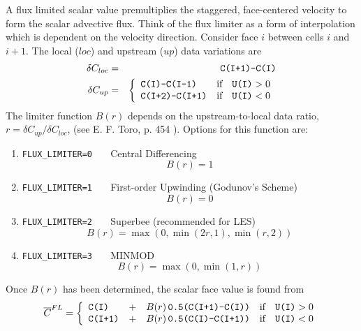 \documentclass[11pt]{article}
\begin{document}
A flux limited scalar value premultiplies the staggered, face-centered velocity to form the scalar advective flux.  Think of the flux limiter as a form of interpolation which is dependent on the velocity direction. Consider face $i$ between cells $i$ and $i+1$.  The local ($loc$) and upstream ($up$) data variations are
\begin{eqnarray}
\delta C_{loc} &=& \mbox{\tt C(I+1)-C(I)} \nonumber\\
\delta C_{up}  &=& \left\{ \begin{array}{ll} \mbox{\tt C(I)-C(I-1)} & \mbox{if} \quad \mbox{\tt U(I)}>0 \\ \mbox{\tt C(I+2)-C(I+1)} & \mbox{if} \quad \mbox{\tt U(I)}<0 \end{array} \right. \nonumber
\end{eqnarray}
The limiter function $B(r)$ depends on the upstream-to-local data ratio, $r=\delta C_{up}/\delta C_{loc}$, (see E. F. Toro, p. 454 \cite{Toro}).  Options for this function are:
\begin{enumerate}
\item[]{\tt FLUX\_LIMITER=0\,\,\,} Central Differencing  \begin{equation} B(r) = 1 \end{equation}
\item[]{\tt FLUX\_LIMITER=1\,\,\,} First-order Upwinding (Godunov's Scheme) \begin{equation} B(r) = 0 \end{equation}
\item[]{\tt FLUX\_LIMITER=2\,\,\,} Superbee (recommended for LES) \begin{equation} B(r) = \max(0,\min(2r,1),\min(r,2)) \end{equation}
\item[]{\tt FLUX\_LIMITER=3\,\,\,} MINMOD \begin{equation} B(r) = \max(0,\min(1,r)) \end{equation}
\end{enumerate}
Once $B(r)$ has been determined, the scalar face value is found from
\begin{equation}
\label{eqn_flux_limiter}
\overline{C}^{\tiny FL} = \left\{ \begin{array}{lcll} \mbox{\tt C(I)} &+& B(r) \,\mbox{\tt 0.5(C(I+1)-C(I))} & \mbox{if} \quad \mbox{\tt U(I)}>0 \\
\mbox{\tt C(I+1)} &+& B(r) \,\mbox{\tt 0.5(C(I)-C(I+1))} & \mbox{if} \quad \mbox{\tt U(I)}<0 \end{array} \right.
\end{equation}
\end{document}
